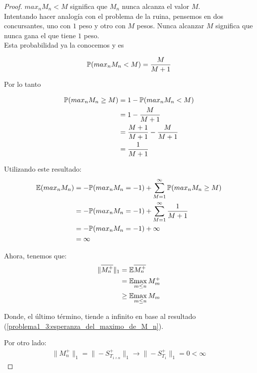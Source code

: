 \begin{proof}
		${max_n M_n < M}$ significa que ${M_n}$ nunca alcanza el valor ${M}$.\\
		 
		Intentando hacer analogía con el problema de la ruina, pensemos en dos concursantes,
		uno con ${1}$ peso y otro con ${M}$ pesos. Nunca alcanzar ${M}$ significa que nunca gana el que tiene ${1}$ peso.\\
		
		Esta probabilidad ya la conocemos y es 
		
		\begin{align*}
			\mathbb{P}(max_n M_n < M) = \frac{M}{M + 1}
		\end{align*}
			
		Por lo tanto
		
		\begin{align}
			\mathbb{P}(max_n M_n \geq M) 	&= 1 - \mathbb{P}(max_n M_n < M) \\
									&= 1 - \frac{M}{M + 1}\\
									&= \frac{M+1}{M+1} - \frac{M}{M + 1}\\
									&= \frac{1}{M+1}
		\end{align}
		
		Utilizando este resultado:
		\begin{align} \label{problema1_3:esperanza_del_maximo_de_M_n}
			\mathbb{E}(max_n M_n) 	&= - \mathbb{P}(max_n M_n = -1) + \sum_{M=1}^{\infty} \mathbb{P}(max_n M_n \geq M) \\
							&= - \mathbb{P}(max_n M_n = -1) + \sum_{M=1}^{\infty} \frac{1}{M+1} \\ 
							&= - \mathbb{P}(max_n M_n = -1) + \infty \\
							&= \infty
		\end{align}						
		
		Ahora, tenemos que:
		\begin{align}
			\|\overline{M_{n}^{+}}\|_1  &=    \mathbb{E}{\overline{M_{n}^{+}}} \\
										&=    \mathbb{E}{\max_{m \leq n}M_m^+} \\
										&\geq \mathbb{E}{\max_{m \leq n}M_m}										
		\end{align}
			
		Donde, el último término, tiende a infinito en base al resultado 
		(\ref{problema1_3:esperanza_del_maximo_de_M_n}).

		Por otro lado:
		\begin{align}
			\|M_n^+\|_1=\|-S_{T_{1\wedge n}}^{+}\|_1  \longrightarrow  \|-S_{T_1}^+\|_1 = 0 < \infty
		\end{align}
		

\end{proof}
